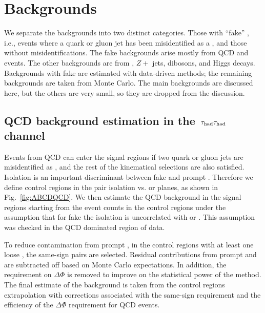 \section{Backgrounds}
\label{sect:bkg}
We separate the backgrounds into two distinct categories.  Those with 
``fake'' \Tau, i.e., events where a quark or gluon jet has been misidentified
as a \Tau, and those without \Tau misidentifications.  
The fake \Tau backgrounds arise mostly from QCD and \wjets events.  The 
other backgrounds are from \ttbar, $Z+$ jets, dibosons, and Higgs decays.
Backgrounds with fake \Tau are estimated with data-driven methods; the 
remaining backgrounds are taken from Monte Carlo. The main backgrounds
are discussed here, but the others are very small, so they are dropped from the 
discussion.


\subsection{\texorpdfstring{QCD background estimation in the $\,\tau_{\rm had}\tau_{\rm had}$ channel}{QCD background estimation in the tau-tau channel}}
\label{sect:bkgQCD}
Events from QCD can enter the signal regions if two quark or gluon jets are 
misidentified as \Tau, and the rest of the kinematical selections are also 
satisfied.  Isolation is an important 
discriminant between fake \Tau and prompt \Tau.
Therefore we define control regions in the 
\Tau pair isolation vs. \mttwo or \SumMT 
planes, as shown in Fig.~\ref{fig:ABCDQCD}. We then estimate the QCD background
in the signal regions starting from the event counts in the
control regions under the assumption
that for fake \tauTau the isolation is uncorrelated with \mttwo or \SumMT.
This assumption was checked in the QCD dominated region of data.

To reduce contamination from prompt \tauTau, in the control regions with at least one loose \Tau, 
the same-sign pairs are selected.  Residual contributions from prompt
\tauTau and \wjets are subtracted off based on Monte Carlo expectations.
In addition, the requirement on $\Delta \Phi$
is removed to improve on the statistical power of the method. 
The final estimate of the background
is taken from the control regions extrapolation with corrections
associated with the same-sign requirement and the efficiency of 
the $\Delta \Phi$ requirement for QCD events.


